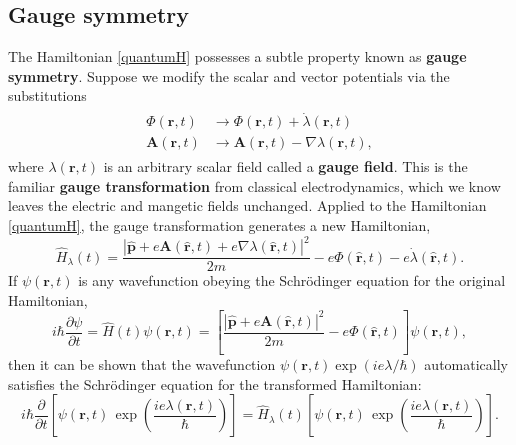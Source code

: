 \documentclass[pra,12pt]{revtex4}
\begin{document}
\subsection{Gauge symmetry}

The Hamiltonian \eqref{quantumH} possesses a subtle property known as
\textbf{gauge symmetry}.  Suppose we modify the scalar and vector
potentials via the substitutions
\begin{align}
  \begin{aligned}
    \Phi(\mathbf{r},t) &\rightarrow \Phi(\mathbf{r},t) + \dot{\lambda}(\mathbf{r},t)\\
    \mathbf{A}(\mathbf{r},t) &\rightarrow
    \mathbf{A}(\mathbf{r},t) - \nabla{\lambda}(\mathbf{r},t),
  \end{aligned}
\end{align}
where $\lambda(\mathbf{r},t)$ is an arbitrary scalar field called a
\textbf{gauge field}.  This is the familiar \textbf{gauge
  transformation} from classical electrodynamics, which we know leaves
the electric and mangetic fields unchanged.  Applied to the
Hamiltonian \eqref{quantumH}, the gauge transformation generates a new
Hamiltonian,
\begin{equation}
  \hat{H}_\lambda(t)
  = \frac{|\hat{\mathbf{p}}+e\mathbf{A}(\hat{\mathbf{r}},t) + e\nabla\lambda(\hat{\mathbf{r}},t)|^2}{2m}
  - e\Phi(\hat{\mathbf{r}},t) - e\dot{\lambda}(\hat{\mathbf{r}},t).
\end{equation}
If $\psi(\mathbf{r},t)$ is any wavefunction obeying the Schr\"odinger
equation for the original Hamiltonian,
\begin{equation}
  i\hbar\frac{\partial\psi}{\partial t} =
  \hat{H}(t) \psi(\mathbf{r},t)
  = \left[\frac{|\hat{\mathbf{p}}+e\mathbf{A}(\hat{\mathbf{r}},t)|^2}{2m}
  - e\Phi(\hat{\mathbf{r}},t) \right]\psi(\mathbf{r},t),
\end{equation}
then it can be shown that the wavefunction $\psi(\mathbf{r},t)
\exp(ie\lambda/\hbar)$ automatically satisfies the Schr\"odinger
equation for the transformed Hamiltonian:
\begin{equation}
  i\hbar\frac{\partial}{\partial t} \left[\psi(\mathbf{r},t) \, \exp\left(\frac{ie\lambda(\mathbf{r},t)}{\hbar}\right)\right] =
  \hat{H}_\lambda(t) \left[\psi(\mathbf{r},t) \, \exp\left(\frac{ie\lambda(\mathbf{r},t)}{\hbar}\right)\right].
  \label{gaugeschrod}
\end{equation}
\end{document}
